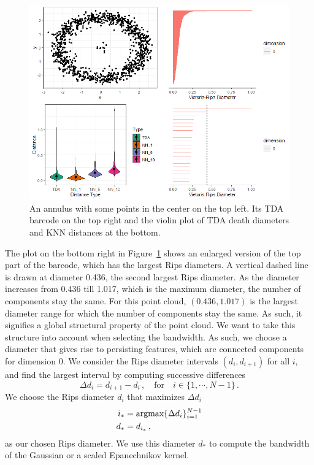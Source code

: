 \documentclass[letter,12pt]{article}
\newcommand{\argmax}{\mathop{\text{argmax}}}
\begin{document}
\begin{figure}[!ht]
    \centering
    \includegraphics[scale=0.8]{Graphics/TDA_and_KNN.png}
    \caption{An annulus with some points in the center on the top left. Its TDA barcode on the top right and the violin plot of TDA death diameters and KNN distances at the bottom.}
    \label{fig:TDAKNN}
\end{figure}

The plot on the bottom right in Figure~\ref{fig:TDAKNN} shows an enlarged version of the top part of the barcode, which has the largest Rips diameters. A vertical dashed line is drawn at diameter 0.436, the second largest Rips diameter. As the diameter increases from 0.436 till 1.017, which is the maximum diameter, the number of components stay the same. For this point cloud, $(0.436, 1.017)$ is the largest diameter range for which the number of components stay the same. As such, it signifies a global structural property of the point cloud. We want to take this structure into account when selecting the bandwidth. As such, we choose a diameter that gives rise to persisting features, which are connected components for dimension $0$. We consider the Rips diameter intervals $(d_i, d_{i+1})$ for all $i$, and find the largest interval by computing successive differences 
\begin{equation}\label{eq:deathrad1}
    \Delta d_i = d_{i+1} - d_i\, ,  \quad \text{for} \quad i \in \{1, \cdots,  N-1 \} \, . 
\end{equation}
We choose the Rips diameter $d_i$ that maximizes $\Delta d_i$
\begin{align}\label{eq:deathrad2}
    i_* & = \argmax \{ \Delta d_i \}_{i=1}^{N-1}  \notag\\
    d_* & = d_{i_*} \, ,
\end{align}
as our chosen Rips diameter. We use this diameter $d_*$ to compute the bandwidth of the Gaussian or a scaled Epanechnikov kernel.  
\end{document}
